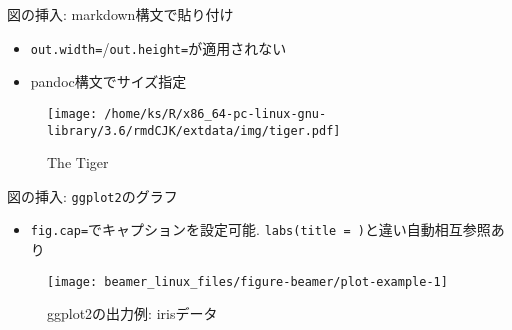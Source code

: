 \documentclass[
  12pt,
  ignorenonframetext,
]{beamer}
\newenvironment{Shaded}{\begin{snugshade}}{\end{snugshade}}
\newcommand{\AlertTok}[1]{\textcolor[rgb]{0.94,0.16,0.16}{#1}}
\newcommand{\NormalTok}[1]{#1}
\providecommand{\tightlist}{%
  \setlength{\itemsep}{0pt}\setlength{\parskip}{0pt}}
\begin{document}
\begin{frame}[fragile]{図の挿入: markdown構文で貼り付け}
\protect\hypertarget{ux56f3ux306eux633fux5165-markdownux69cbux6587ux3067ux8cbcux308aux4ed8ux3051}{}

\begin{itemize}
\tightlist
\item
  \texttt{out.width=}/\texttt{out.height=}が適用されない
\item
  pandoc構文でサイズ指定
\end{itemize}

\begin{Shaded}
\end{Shaded}

\begin{figure}
\centering
\texttt{[image: /home/ks/R/x86\_64-pc-linux-gnu-library/3.6/rmdCJK/extdata/img/tiger.pdf]}
\caption{The Tiger}
\end{figure}

\end{frame}

\begin{frame}[fragile]{図の挿入: \texttt{ggplot2}のグラフ}
\protect\hypertarget{ux56f3ux306eux633fux5165-ggplot2ux306eux30b0ux30e9ux30d5}{}

\begin{itemize}
\tightlist
\item
  \texttt{fig.cap=}でキャプションを設定可能.
  \texttt{labs(title\ =\ )}と違い自動相互参照あり
\end{itemize}

\begin{figure}

{\centering \texttt{[image: beamer\_linux\_files/figure-beamer/plot-example-1]} 

}

\caption{ggplot2の出力例: irisデータ}\label{fig:plot-example}
\end{figure}

\end{frame}
\end{document}
